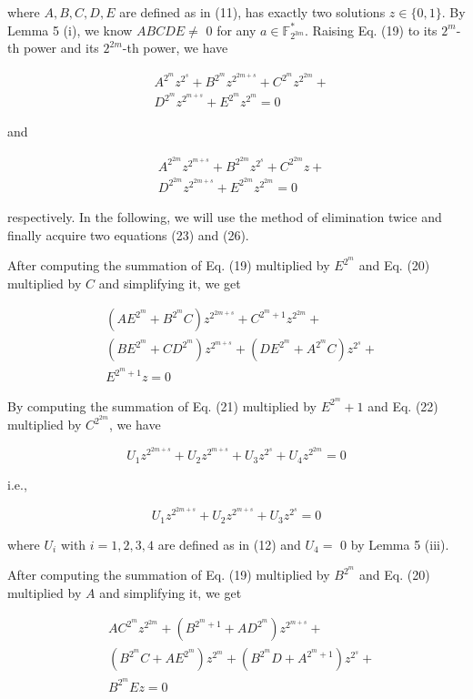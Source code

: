 \documentclass[10pt]{article}
\begin{document}
where $A, B, C, D, E$ are defined as in (11), has exactly two solutions $z \in\{0,1\}$. By Lemma 5 (i), we know $A B C D E \neq$ 0 for any $a \in \mathbb{F}_{2^{3 m}}^{*}$. Raising Eq. (19) to its $2^{m}$-th power and its $2^{2 m}$-th power, we have


\begin{align*}
& A^{2^{m}} z^{2^{s}}+B^{2^{m}} z^{2^{2 m+s}}+C^{2^{m}} z^{2^{2 m}}+ \\
& D^{2^{m}} z^{2^{m+s}}+E^{2^{m}} z^{2^{m}}=0 \tag{20}
\end{align*}


and


\begin{align*}
& A^{2^{2 m}} z^{2^{m+s}}+B^{2^{2 m}} z^{2^{s}}+C^{2^{2 m}} z+ \\
& D^{2^{2 m}} z^{2^{2 m+s}}+E^{2^{2 m}} z^{2^{2 m}}=0 \tag{21}
\end{align*}


respectively. In the following, we will use the method of elimination twice and finally acquire two equations (23) and (26).

After computing the summation of Eq. (19) multiplied by $E^{2^{m}}$ and Eq. (20) multiplied by $C$ and simplifying it, we get


\begin{align*}
& \left(A E^{2^{m}}+B^{2^{m}} C\right) z^{2^{2 m+s}}+C^{2^{m}+1} z^{2^{2 m}}+ \\
& \left(B E^{2^{m}}+C D^{2^{m}}\right) z^{2^{m+s}}+\left(D E^{2^{m}}+A^{2^{m}} C\right) z^{2^{s}}+ \\
& E^{2^{m}+1} z=0 \tag{22}
\end{align*}


By computing the summation of Eq. (21) multiplied by $E^{2^{m}}+1$ and Eq. (22) multiplied by $C^{2^{2 m}}$, we have

$$
U_{1} z^{2^{2 m+s}}+U_{2} z^{2^{m+s}}+U_{3} z^{2^{s}}+U_{4} z^{2^{2 m}}=0
$$

i.e.,


\begin{equation*}
U_{1} z^{2^{2 m+s}}+U_{2} z^{2^{m+s}}+U_{3} z^{2^{s}}=0 \tag{23}
\end{equation*}


where $U_{i}$ with $i=1,2,3,4$ are defined as in (12) and $U_{4}=$ 0 by Lemma 5 (iii).

After computing the summation of Eq. (19) multiplied by $B^{2^{m}}$ and Eq. (20) multiplied by $A$ and simplifying it, we get


\begin{align*}
& A C^{2^{m}} z^{2^{2 m}}+\left(B^{2^{m}+1}+A D^{2^{m}}\right) z^{2^{m+s}}+ \\
& \left(B^{2^{m}} C+A E^{2^{m}}\right) z^{2^{m}}+\left(B^{2^{m}} D+A^{2^{m}+1}\right) z^{2^{s}}+ \\
& B^{2^{m}} E z=0 \tag{24}
\end{align*}
\end{document}
